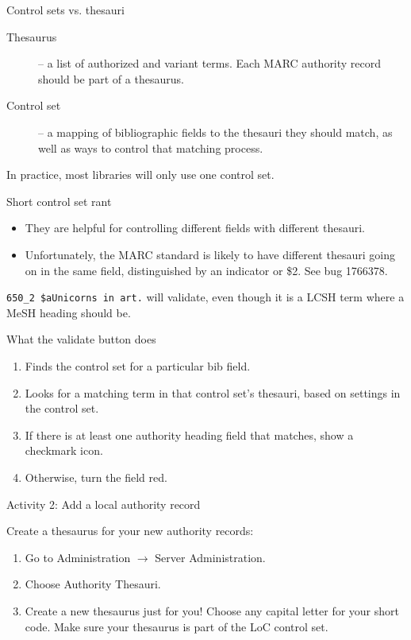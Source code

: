 \documentclass{beamer}
\begin{document}
\begin{frame}{Control sets vs. thesauri}
 \begin{description}
  \item[Thesaurus] -- a list of authorized and variant terms.  Each MARC authority record should be part of a thesaurus.
  \item[Control set] -- a mapping of bibliographic fields to the thesauri they should match, as well as ways to control that matching process.
 \end{description}
In practice, most libraries will only use one control set.
\end{frame}

\begin{frame}{Short control set rant}
\begin{itemize}
 \item They are helpful for controlling different fields with different thesauri.
 \item Unfortunately, the MARC standard is likely to have different thesauri going on in the same field, distinguished by an indicator or \$2.  See bug 1766378.
\end{itemize}

\texttt{650\_2 \$aUnicorns in art.} will validate, even though it is a LCSH term where a MeSH heading should be.

\end{frame}


\begin{frame}{What the validate button does}
 \begin{enumerate}
  \item Finds the control set for a particular bib field.
  \item Looks for a matching term in that control set's thesauri, based on settings in the control set.
  \item If there is at least one authority heading field that matches, show a checkmark icon.
  \item Otherwise, turn the field red.
 \end{enumerate}

\end{frame}



\begin{frame}{Activity 2: Add a local authority record}

Create a thesaurus for your new authority records:
\begin{enumerate}
 \item Go to Administration $\rightarrow$ Server Administration.
 \item Choose Authority Thesauri.
 \item Create a new thesaurus just for you!  Choose any capital letter for your short code.
 Make sure your thesaurus is part of the LoC control set.
\end{enumerate}

\end{frame}
\end{document}
